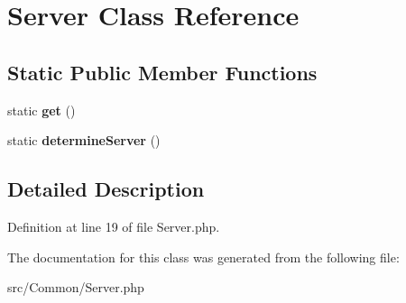 \hypertarget{class_zest_1_1_common_1_1_server}{}\section{Server Class Reference}
\label{class_zest_1_1_common_1_1_server}
\subsection*{Static Public Member Functions}
\begin{DoxyCompactItemize}
\item 
\mbox{\label{class_zest_1_1_common_1_1_server_a5ba61361bf0695a285bbaefefc427191}} 
static {\bfseries get} ()
\item 
\mbox{\label{class_zest_1_1_common_1_1_server_adea3dfe6edad97029b3fa8b8e76fb663}} 
static {\bfseries determine\+Server} ()
\end{DoxyCompactItemize}


\subsection{Detailed Description}


Definition at line 19 of file Server.\+php.



The documentation for this class was generated from the following file\+:\begin{DoxyCompactItemize}
\item 
src/\+Common/Server.\+php\end{DoxyCompactItemize}

